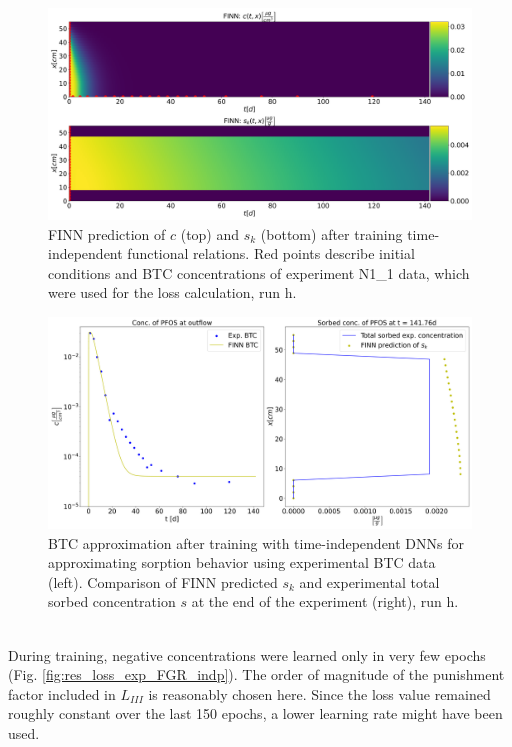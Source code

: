 \begin{figure}[h!]
	\centering
	\includegraphics[width=\textwidth]{images/res_ov_exp_FGR_indp.png}
\caption[FINN predicted solution after training, run h]{FINN prediction of $c$ (top) and $s_k$ (bottom) after training time-independent functional relations. Red points describe initial conditions and BTC concentrations of experiment N1\_1 data, which were used for the loss calculation, run h.}
\label{fig:res_ov_exp_FGR_indp}
\end{figure}
\begin{figure}[h!]
	\centering
	\includegraphics[width=\textwidth]{images/res_btc_exp_FGR_indp.png}
\caption[FINN predicted BTC after training, run h]{BTC approximation after training with time-independent DNNs for approximating sorption behavior using experimental BTC data (left). Comparison of FINN predicted $s_k$ and experimental total sorbed concentration $s$ at the end of the experiment (right), run h.}
\label{fig:res_btc_exp_FGR_indp}
\end{figure}\\
During training, negative concentrations were learned only in very few epochs (Fig. \ref{fig:res_loss_exp_FGR_indp}). The order of magnitude of the punishment factor included in $L_{III}$ is reasonably chosen here. Since the loss value remained roughly constant over the last 150 epochs, a lower learning rate might have been used.
